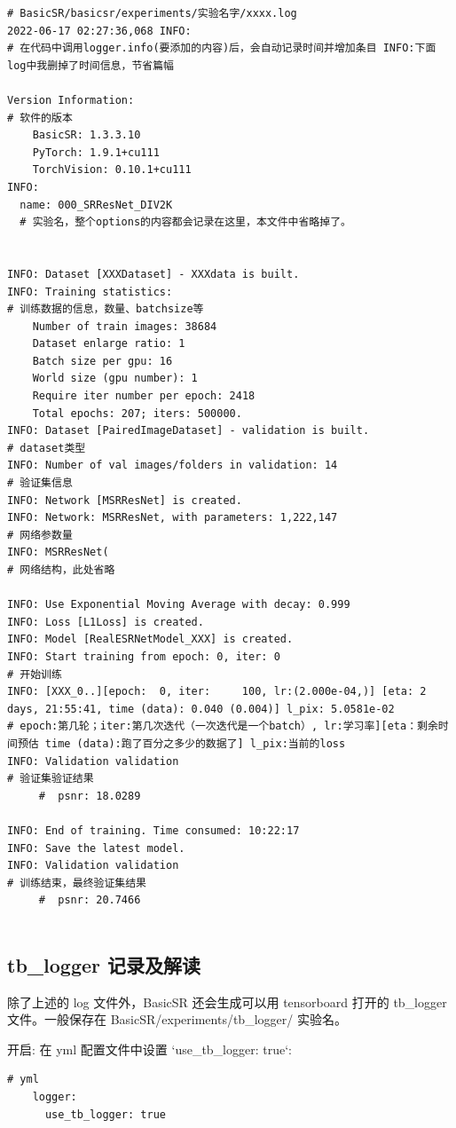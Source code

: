 \documentclass[../main.tex]{subfiles}
\begin{document}
\begin{verbatim}
# BasicSR/basicsr/experiments/实验名字/xxxx.log
2022-06-17 02:27:36,068 INFO: 
# 在代码中调用logger.info(要添加的内容)后，会自动记录时间并增加条目 INFO:下面log中我删掉了时间信息，节省篇幅

Version Information: 
# 软件的版本
	BasicSR: 1.3.3.10
	PyTorch: 1.9.1+cu111
	TorchVision: 0.10.1+cu111
INFO: 
  name: 000_SRResNet_DIV2K
  # 实验名，整个options的内容都会记录在这里，本文件中省略掉了。
  

INFO: Dataset [XXXDataset] - XXXdata is built.
INFO: Training statistics:
# 训练数据的信息，数量、batchsize等
	Number of train images: 38684
	Dataset enlarge ratio: 1
	Batch size per gpu: 16
	World size (gpu number): 1
	Require iter number per epoch: 2418
	Total epochs: 207; iters: 500000.
INFO: Dataset [PairedImageDataset] - validation is built.
# dataset类型
INFO: Number of val images/folders in validation: 14
# 验证集信息
INFO: Network [MSRResNet] is created.
INFO: Network: MSRResNet, with parameters: 1,222,147
# 网络参数量
INFO: MSRResNet(
# 网络结构，此处省略
  
INFO: Use Exponential Moving Average with decay: 0.999
INFO: Loss [L1Loss] is created.
INFO: Model [RealESRNetModel_XXX] is created.
INFO: Start training from epoch: 0, iter: 0
# 开始训练
INFO: [XXX_0..][epoch:  0, iter:     100, lr:(2.000e-04,)] [eta: 2 days, 21:55:41, time (data): 0.040 (0.004)] l_pix: 5.0581e-02 
# epoch:第几轮；iter:第几次迭代（一次迭代是一个batch）, lr:学习率][eta：剩余时间预估 time (data):跑了百分之多少的数据了] l_pix:当前的loss 
INFO: Validation validation
# 验证集验证结果
	 #  psnr: 18.0289
	 
INFO: End of training. Time consumed: 10:22:17
INFO: Save the latest model.
INFO: Validation validation
# 训练结束，最终验证集结果
	 #  psnr: 20.7466
	 
\end{verbatim}

\subsection{tb\_logger 记录及解读}

除了上述的 log 文件外，BasicSR 还会生成可以用 tensorboard 打开的 tb\_logger 文件。一般保存在 BasicSR/experiments/tb\_logger/ 实验名。


开启: 在 yml 配置文件中设置 `use\_tb\_logger: true`:
\begin{verbatim}
# yml
    logger:
      use_tb_logger: true
\end{verbatim}
\end{document}
